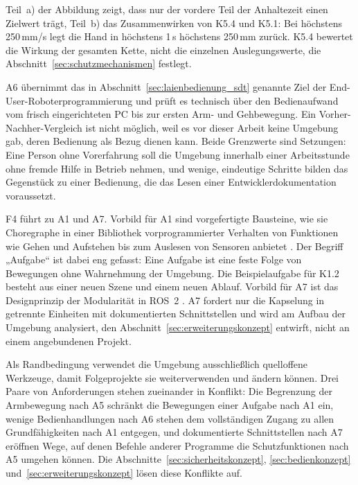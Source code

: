 Teil~a) der Abbildung zeigt, dass nur der vordere Teil der Anhaltezeit einen Zielwert trägt, Teil~b) das Zusammenwirken von K5.4 und K5.1: Bei höchstens 250\,mm/s legt die Hand in höchstens 1\,s höchstens 250\,mm zurück.
K5.4 bewertet die Wirkung der gesamten Kette, nicht die einzelnen Auslegungswerte, die Abschnitt~\ref{sec:schutzmechanismen} festlegt.

A6 übernimmt das in Abschnitt~\ref{sec:laienbedienung_sdt} genannte Ziel der End-User-Roboterprogrammierung und prüft es technisch über den Bedienaufwand vom frisch eingerichteten PC bis zur ersten Arm- und Gehbewegung.
Ein Vorher-Nachher-Vergleich ist nicht möglich, weil es vor dieser Arbeit keine Umgebung gab, deren Bedienung als Bezug dienen kann.
Beide Grenzwerte sind Setzungen: Eine Person ohne Vorerfahrung soll die Umgebung innerhalb einer Arbeitsstunde ohne fremde Hilfe in Betrieb nehmen, und wenige, eindeutige Schritte bilden das Gegenstück zu einer Bedienung, die das Lesen einer Entwicklerdokumentation voraussetzt.

F4 führt zu A1 und A7.
Vorbild für A1 sind vorgefertigte Bausteine, wie sie Choregraphe in einer Bibliothek vorprogrammierter Verhalten von Funktionen wie Gehen und Aufstehen bis zum Auslesen von Sensoren anbietet \cite{Pot2009}.
Der Begriff „Aufgabe“ ist dabei eng gefasst: Eine Aufgabe ist eine feste Folge von Bewegungen ohne Wahrnehmung der Umgebung. Die Beispielaufgabe für K1.2 besteht aus einer neuen Szene und einem neuen Ablauf.
Vorbild für A7 ist das Designprinzip der Modularität in ROS~2 \cite{Macenski2022}.
A7 fordert nur die Kapselung in getrennte Einheiten mit dokumentierten Schnittstellen und wird am Aufbau der Umgebung analysiert, den Abschnitt~\ref{sec:erweiterungskonzept} entwirft, nicht an einem angebundenen Projekt.

Als Randbedingung verwendet die Umgebung ausschließlich quelloffene Werkzeuge, damit Folgeprojekte sie weiterverwenden und ändern können.
Drei Paare von Anforderungen stehen zueinander in Konflikt: Die Begrenzung der Armbewegung nach A5 schränkt die Bewegungen einer Aufgabe nach A1 ein, wenige Bedienhandlungen nach A6 stehen dem vollständigen Zugang zu allen Grundfähigkeiten nach A1 entgegen, und dokumentierte Schnittstellen nach A7 eröffnen Wege, auf denen Befehle anderer Programme die Schutzfunktionen nach A5 umgehen können.
Die Abschnitte~\ref{sec:sicherheitskonzept}, \ref{sec:bedienkonzept} und~\ref{sec:erweiterungskonzept} lösen diese Konflikte auf.

